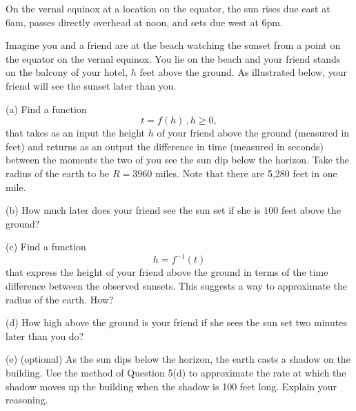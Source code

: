 \documentclass{ximera}
\begin{document}
\begin{question} \label{Q6:RightTriangle}
On the vernal equinox at a location on the equator, the sun rises due east at 6am, passes directly overhead at noon, and sets due west at 6pm. 

Imagine you and a friend are at the beach watching the sunset from a point on the equator on the vernal equinox. You lie on the beach and your friend stands on the balcony of your hotel, $h$ feet above the ground. As illustrated below, your friend will see the sunset later than you. 

(a) Find a function
\[
   t = f(h) \, , h\geq 0 ,
\]
that takes as an input the height $h$ of your friend above the ground (measured in feet) and returns as an output the difference in time (measured in seconds) between the moments the two of you see the sun dip below the horizon. Take the radius of the earth to be $R=3960$ miles. Note that there are 5,280 feet in one mile.

(b) How much later does your friend see the sun set if she is $100$ feet above the ground?

(c) Find a function 
\[
   h = f^{-1}(t)
\]
that express the height of your friend above the ground in terms of the time difference between the observed sunsets. This suggests a way to approximate the radius of the earth. How?

(d) How high above the ground is your friend if she sees the sun set two minutes later than you do?

(e) (optional) As the sun dips below the horizon, the earth casts a shadow on the building. Use the method of Question 5(d) to approximate the rate at which the shadow moves up the building when the shadow is 100 feet long. Explain your reasoning.
\begin{exploration}

 
\begin{onlineOnly}
    \begin{center}
\end{center}
\end{onlineOnly}
\end{exploration}

\end{question}
\end{document}
